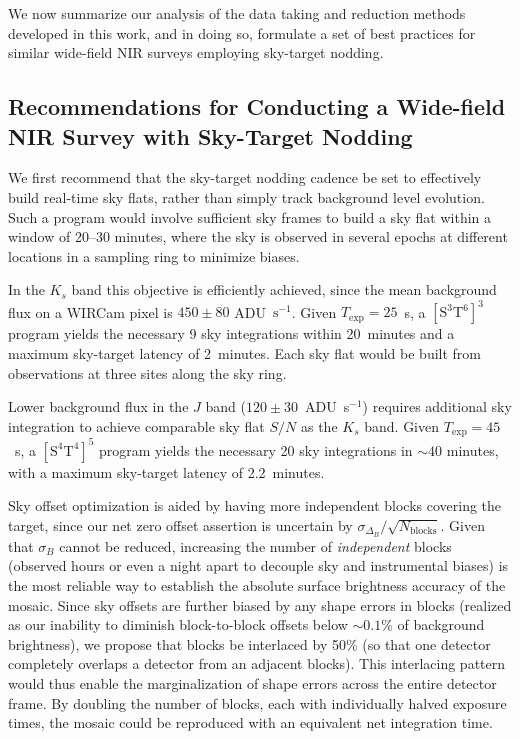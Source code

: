 \documentclass[iop]{emulateapj}
\newcommand{\todo}[1]{\textcolor{BurntOrange}{\textsf{#1}}} %
\begin{document}
We now summarize our analysis of the data taking and reduction methods developed in this work, and in doing so, formulate a set of best practices for similar wide-field NIR surveys employing sky-target nodding.

\subsection{Recommendations for Conducting a Wide-field NIR Survey with Sky-Target Nodding}

We first recommend that the sky-target nodding cadence be set to effectively build real-time sky flats, rather than simply track background level evolution.
Such a program would involve sufficient sky frames to build a sky flat within a window of 20--30 minutes, where the sky is observed in several epochs at different locations in a sampling ring to minimize biases.

In the $K_s$ band this objective is efficiently achieved, since the mean background flux on a WIRCam pixel is $450 \pm 80$ ADU~$\mathrm{s^{-1}}$.
Given $T_\mathrm{exp}=25$~s, a $\mathrm{[S^3T^6]^3}$ program yields the necessary 9 sky integrations within 20~minutes and a maximum sky-target latency of 2~minutes.
Each sky flat would be built from observations at three sites along the sky ring.

Lower background flux in the $J$ band ($120 \pm 30$~ADU~s$^{-1}$) requires additional sky integration to achieve comparable sky flat $S/N$ as the $K_s$ band.
Given $T_\mathrm{exp}=45$~s, a $\mathrm{[S^4T^4]^5}$ program yields the necessary 20 sky integrations in $\sim 40$ minutes, with a maximum sky-target latency of 2.2~minutes.

Sky offset optimization is aided by having more independent blocks covering the target, since our net zero offset assertion is uncertain by $\sigma_{\Delta_B} / \sqrt{N_\mathrm{blocks}}$.
Given that $\sigma_B$ cannot be reduced, increasing the number of \emph{independent} blocks (observed hours or even a night apart to decouple sky and instrumental biases) is the most reliable way to establish the absolute surface brightness accuracy of the mosaic.
Since sky offsets are further biased by any shape errors in blocks (realized as our inability to diminish block-to-block offsets below $\sim 0.1\%$ of background brightness), we propose that blocks be interlaced by 50\% (so that one detector completely overlaps a detector from an adjacent blocks).
This interlacing pattern would thus enable the marginalization of shape errors across the entire detector frame.
By doubling the number of blocks, each with individually halved exposure times, the mosaic could be reproduced with an equivalent net integration time.
\end{document}
